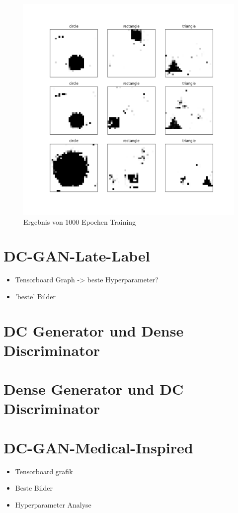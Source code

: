 \begin{figure}[H]
	\centering
	\includegraphics[height=0.4\textheight]{kapitel/5_ergebnisse/densegan/good_example_long.png}
	\caption{Ergebnis von 1000 Epochen Training}
	\label{ergebnis:densegan-good-example-long}
\end{figure}

\section{DC-GAN-Late-Label}
\begin{itemize}
	\item Tensorboard Graph -> beste Hyperparameter?
	\item 'beste' Bilder
\end{itemize}

\section{DC Generator und Dense Discriminator}

\section{Dense Generator und DC Discriminator}

\section{DC-GAN-Medical-Inspired}
\begin{itemize}
	\item Tensorboard grafik
	\item Beste Bilder
	\item Hyperparameter Analyse
\end{itemize}
